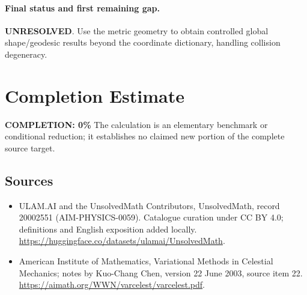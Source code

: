 \documentclass[11pt]{article}
\begin{document}
\paragraph{Final status and first remaining gap.}
\textbf{UNRESOLVED}. Use the metric geometry to obtain controlled global shape/geodesic results beyond the coordinate dictionary, handling collision degeneracy.

\section{Completion Estimate}
\noindent\textbf{COMPLETION: 0\%}
The calculation is an elementary benchmark or conditional reduction; it establishes no claimed new portion of the complete source target.

\subsection{Sources}
\begin{itemize}
\item[\hypertarget{source:20002551:1}{S1}] ULAM.AI and the UnsolvedMath Contributors, UnsolvedMath, record 20002551 (AIM-PHYSICS-0059). Catalogue curation under CC BY 4.0; definitions and English exposition added locally.
\url{https://huggingface.co/datasets/ulamai/UnsolvedMath}.
\item[\hypertarget{source:20002551:2}{S2}] American Institute of Mathematics, Variational Methods in Celestial Mechanics; notes by Kuo-Chang Chen, version 22 June 2003, source item 22.
\url{https://aimath.org/WWN/varcelest/varcelest.pdf}.
\end{itemize}
\label{end:20002551}
\end{document}
